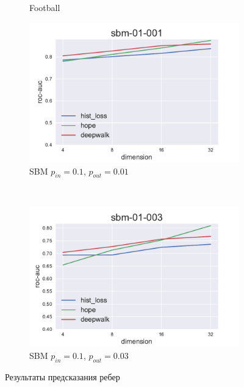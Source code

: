 \documentclass[12pt,a4paper]{extarticle}
\begin{document}
\begin{figure}
\begin{subfigure}{.5\linewidth}
    \caption{Football}
    \label{fig:lp_foot}
    \end{subfigure}
    \begin{subfigure}{.5\linewidth}
    \centering
    \includegraphics[width=\linewidth]{src/images/Link_prediction_sbm-01-001.pdf}
    \caption{SBM $p_{in}=0.1$, $p_{out}=0.01$}
    \label{fig:lp_sbm1}
    \end{subfigure}
    \\[1ex]
    \begin{subfigure}{.5\linewidth}
    \centering
    \includegraphics[width=\linewidth]{src/images/Link_prediction_sbm-01-003.pdf}
    \caption{SBM $p_{in}=0.1$, $p_{out}=0.03$}
    \label{fig:lp_sbm2}
    \end{subfigure}
    \caption{Результаты предсказания ребер}
    \label{fig:lp}
    \end{figure}
    
\end{document}
